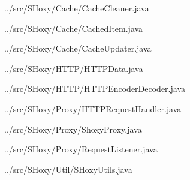 \documentclass[11pt]{article}
\begin{document}
\begin{tiny}

\begin{lstinputlisting}[language=Java]{../src/SHoxy/Cache/CacheCleaner.java}
\end{lstinputlisting}
\begin{lstinputlisting}[language=Java]{../src/SHoxy/Cache/CachedItem.java}
\end{lstinputlisting}
\begin{lstinputlisting}[language=Java]{../src/SHoxy/Cache/CacheUpdater.java}
\end{lstinputlisting}
\begin{lstinputlisting}[language=Java]{../src/SHoxy/HTTP/HTTPData.java}
\end{lstinputlisting}
\begin{lstinputlisting}[language=Java]{../src/SHoxy/HTTP/HTTPEncoderDecoder.java}
\end{lstinputlisting}
\begin{lstinputlisting}[language=Java]{../src/SHoxy/Proxy/HTTPRequestHandler.java}
\end{lstinputlisting}
\begin{lstinputlisting}[language=Java]{../src/SHoxy/Proxy/ShoxyProxy.java}
\end{lstinputlisting}
\begin{lstinputlisting}[language=Java]{../src/SHoxy/Proxy/RequestListener.java}
\end{lstinputlisting}
\begin{lstinputlisting}[language=Java]{../src/SHoxy/Util/SHoxyUtils.java}
\end{lstinputlisting}

\end{tiny}
\end{document}
